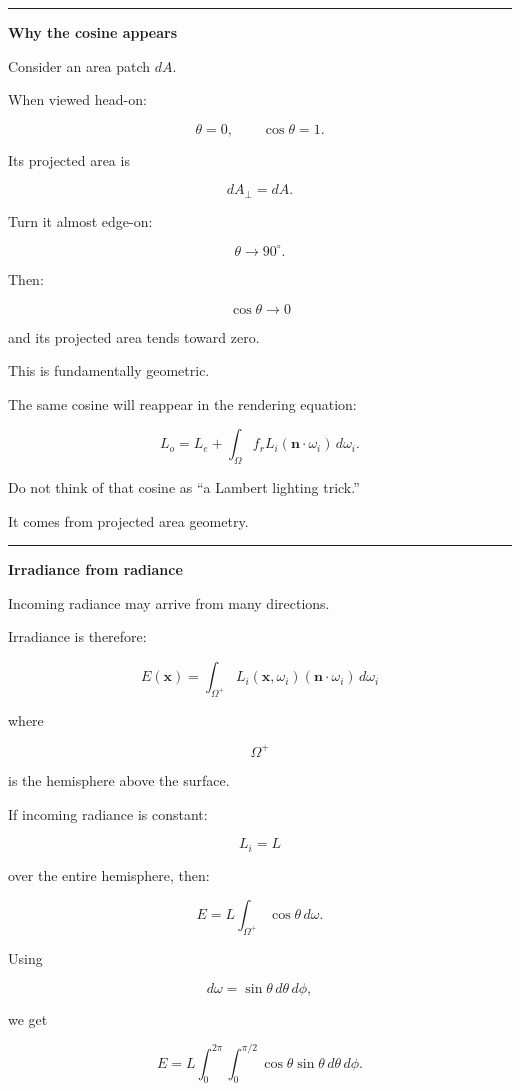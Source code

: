\begin{center}\rule{0.5\linewidth}{0.5pt}\end{center}

\textbf{Why the cosine appears}

Consider an area patch \(dA\).

When viewed head-on:

\[
\theta=0,\qquad\cos\theta=1.
\]

Its projected area is

\[
dA_\perp=dA.
\]

Turn it almost edge-on:

\[
\theta\rightarrow90^\circ.
\]

Then:

\[
\cos\theta\rightarrow0
\]

and its projected area tends toward zero.

This is fundamentally geometric.

The same cosine will reappear in the rendering equation:

\[
L_o=
L_e+
\int_\Omega
f_r
L_i
(\mathbf n\cdot\omega_i)
\,d\omega_i.
\]

Do not think of that cosine as ``a Lambert lighting trick.''

It comes from projected area geometry.

\begin{center}\rule{0.5\linewidth}{0.5pt}\end{center}

\textbf{Irradiance from radiance}

Incoming radiance may arrive from many directions.

Irradiance is therefore:

\[
\boxed{
E(\mathbf x)
=
\int_{\Omega^+}
L_i(\mathbf x,\omega_i)
(\mathbf n\cdot\omega_i)
\,d\omega_i
}
\]

where

\[
\Omega^+
\]

is the hemisphere above the surface.

If incoming radiance is constant:

\[
L_i=L
\]

over the entire hemisphere, then:

\[
E=
L
\int_{\Omega^+}\cos\theta\,d\omega.
\]

Using

\[
d\omega=\sin\theta\,d\theta\,d\phi,
\]

we get

\[
E=
L
\int_0^{2\pi}
\int_0^{\pi/2}
\cos\theta\sin\theta
\,d\theta\,d\phi.
\]

